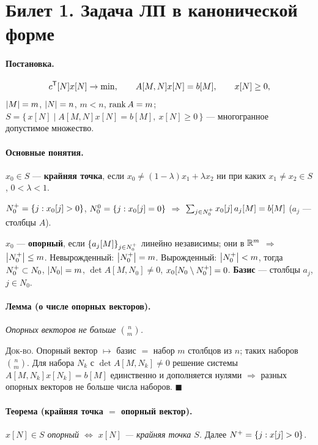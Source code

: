 \section{Билет 1. Задача ЛП в канонической форме}


\paragraph{Постановка.}
\[
  c^{\mathsf{T}}[N]x[N] \to \min , \qquad A[M,N]x[N] = b[M] , \qquad x[N] \ge 0 ,
\]
$\left\lvert M \right\rvert = m$, $\left\lvert N \right\rvert = n$, $m < n$, $\operatorname{rank} A = m$;
$S = \{\, x[N] \mid A[M,N]x[N] = b[M],\ x[N] \ge 0 \,\}$ — многогранное
допустимое множество.

\paragraph{Основные понятия.}
$x_0 \in S$ — \textbf{крайняя точка}, если
$x_0 \ne (1-\lambda)x_1 + \lambda x_2$ ни при каких $x_1 \ne x_2 \in S$,
$0 < \lambda < 1$.

$N_0^{+} = \{j : x_0[j] > 0\}$, $N_0^{0} = \{j : x_0[j] = 0\}$
$\Rightarrow$ $\sum_{j \in N_0^{+}} x_0[j]\,a_j[M] = b[M]$ ($a_j$ — столбцы $A$).

$x_0$ — \textbf{опорный}, если $\{a_j[M]\}_{j \in N_0^{+}}$ линейно независимы;
они в $\mathbb{R}^m$ $\Rightarrow$ $\left\lvert N_0^{+} \right\rvert \le m$. Невырожденный:
$\left\lvert N_0^{+} \right\rvert = m$. Вырожденный: $\left\lvert N_0^{+} \right\rvert < m$, тогда $N_0^{+} \subset N_0$,
$\left\lvert N_0 \right\rvert = m$, $\det A[M,N_0] \ne 0$, $x_0[N_0 \setminus N_0^{+}] = 0$.
\textbf{Базис} — столбцы $a_j$, $j \in N_0$.

\paragraph{Лемма (о числе опорных векторов).}
\textit{Опорных векторов не больше $\binom{n}{m}$.}

\textsc{Док-во.} Опорный вектор $\mapsto$ базис $=$ набор $m$ столбцов из $n$;
таких наборов $\binom{n}{m}$. Для набора $N_k$ с $\det A[M,N_k] \ne 0$ решение
системы $A[M,N_k]x[N_k] = b[M]$ единственно и дополняется нулями
$\Rightarrow$ разных опорных векторов не больше числа наборов.
$\blacksquare$

\paragraph{Теорема (крайняя точка $=$ опорный вектор).}
\textit{$x[N] \in S$ опорный $\iff$ $x[N]$ — крайняя точка $S$.}
Далее $N^{+} = \{j : x[j] > 0\}$.

